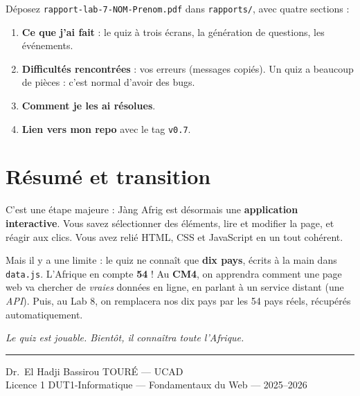 \documentclass[11pt,a4paper]{article}
\newcommand{\code}[1]{\texttt{#1}}
\begin{document}
\begin{attentionbox}
Déposez \code{rapport-lab-7-NOM-Prenom.pdf} dans \code{rapports/}, avec quatre sections :
\begin{enumerate}[leftmargin=*,noitemsep]
  \item \textbf{Ce que j'ai fait} : le quiz à trois écrans, la génération de questions, les événements.
  \item \textbf{Difficultés rencontrées} : vos erreurs (messages copiés). Un quiz a beaucoup de pièces : c'est normal d'avoir des bugs.
  \item \textbf{Comment je les ai résolues}.
  \item \textbf{Lien vers mon repo} avec le tag \code{v0.7}.
\end{enumerate}
\end{attentionbox}

\section{Résumé et transition}

C'est une étape majeure : Jàng Afrig est désormais une \textbf{application interactive}. Vous savez sélectionner des éléments, lire et modifier la page, et réagir aux clics. Vous avez relié HTML, CSS et JavaScript en un tout cohérent.

Mais il y a une limite : le quiz ne connaît que \textbf{dix pays}, écrits à la main dans \code{data.js}. L'Afrique en compte \textbf{54} ! Au \textbf{CM4}, on apprendra comment une page web va chercher de \emph{vraies} données en ligne, en parlant à un service distant (une \emph{API}). Puis, au Lab 8, on remplacera nos dix pays par les 54 pays réels, récupérés automatiquement.

\begin{center}
\textit{Le quiz est jouable. Bientôt, il connaîtra toute l'Afrique.}
\end{center}

\bigskip
\noindent\rule{\textwidth}{0.4pt}
\begin{center}
\small Dr.~El Hadji Bassirou TOURÉ --- UCAD\\
\small Licence 1 DUT1-Informatique --- Fondamentaux du Web --- 2025--2026
\end{center}
\end{document}
